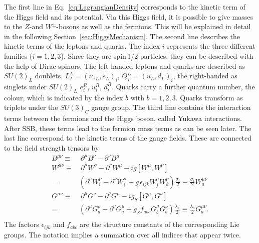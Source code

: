 The first line in Eq.~\eqref{eq:LagrangianDensity} corresponds to the kinetic term of the Higgs field and its potential.
Via this Higgs field, it is possible to give masses to the $Z$-and $W^{\pm}$-bosons as well as the fermions.
This will be explained in detail in the following Section~\ref{sec:HiggsMechanism}.
The second line describes the kinetic terms of the leptons and quarks.
The index $i$ represents the three different families ($i=1,2,3$).
Since they are spin\,1/2 particles, they can be described with the help of Dirac spinors.
The left-handed leptons and quarks are described as $SU(2)_L$ doublets, $L_I^L = \left( \nu_{e\,L},e_L\right)_i$, $Q_I^L = \left( u_{L},d_L\right)_i$,  the right-handed as singlets under $SU(2)_L$ $e_i^R$, $u_i^R$, $d_i^R$.
Quarks carry a further quantum number, the colour, which is indicated by the index $b$ with $b=1,2,3$.
Quarks transform as triplets under the $SU(3)_C$ gauge group.
The third line contains the interaction terms between the fermions and the Higgs boson, called Yukawa interactions.
After SSB, these terms lead to the fermion mass terms as can be seen later.
The last line correspond to the kinetic terms of the gauge fields.
These are connected to the field strength tensors by
\begin{equation}
 \begin{split}
  B^{\mu\nu} \equiv &\ \partial^{\mu} B^{\nu} - \partial^{\nu} B^{\mu}\\  
  W^{\mu\nu} \equiv &\ \partial^{\mu} W^{\nu} - \partial^{\nu} W^{\mu} -i g \left[W^{\mu}, W^{\nu} \right]\\
             =& \left( \partial^{\mu} W_i^{\nu} -\partial^{\nu} W_i^{\mu} + g\, \epsilon_{ijk} W_j^{\mu} W_k^{\nu}  \right) \frac{\sigma_i}{2} \equiv \frac{\sigma_i}{2} W_a^{\mu\nu}\\
  G^{\mu\nu} \equiv &\ \partial^{\mu} G^{\nu} - \partial^{\nu} G^{\mu} - i g_S \left[G^{\mu}, G^{\nu} \right] \\
            =& \left( \partial^{\mu} G_a^{\nu} -\partial^{\nu} G_a^{\mu} + g_S f_{abc} G_b^{\mu} G_b^{\nu}  \right) \frac{\lambda_a}{2} \equiv \frac{\lambda_a}{2} G_a^{\mu\nu}.\\
 \end{split}
\end{equation}
The factors $\epsilon_{ijk}$ and $f_{abc}$ are the structure constants of the corresponding Lie groups.
The notation implies a summation over all indices that appear twice.


